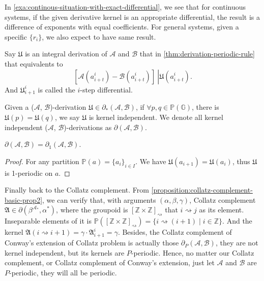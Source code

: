 In \cref{exa:continous-situation-with-exact-differential}, we see that for continuous systems, if the given derivative kernel is an appropriate differential, the result is a difference of exponents with equal coefficients. For general systems, given a specific $\{r_{i}\}$, we also expect to have same result.
\begin{definition}
    Say $\mathfrak{U}$ is an integral derivation of $\mathcal{A}$ and $\mathcal{B}$ that in \cref{thm:derivation-periodic-rule} that equivalents to
    \[ \left.\left[\mathcal{A}(a_{i+t}^{i}) - \mathcal{B}(a_{i+t}^{i})\right]\ \right\vert \mathfrak{U}(a_{i+t}^{i}). \]
    And $\mathfrak{U}_{i+1}^{i}$ is called the $i$-step differential.
\end{definition}
\begin{definition}
    Given a ($\mathcal{A}$, $\mathcal{B}$)-derivation $\mathfrak{U} \in \partial_{*}(\mathcal{A}, \mathcal{B})$, if $\forall p, q\in \mathbb{P}(\mathbb{G})$, there is $\mathfrak{U}(p) = \mathfrak{U}(q)$, we say $\mathfrak{U}$ is kernel independent.
    We denote all kernel independent ($\mathcal{A}$, $\mathcal{B}$)-derivations as $\partial(\mathcal{A}, \mathcal{B})$.
\end{definition}
\begin{proposition}
    $\partial(\mathcal{A}, \mathcal{B}) = \partial_{1}(\mathcal{A}, \mathcal{B})$.
\end{proposition}
\begin{proof}
    For any partition $\mathbb{P}(a) = \{a_i\}_{i\in I}$. We have $\mathfrak{U}(a_{i+1}) = \mathfrak{U}(a_{i})$, thus $\mathfrak{U}$ is 1-periodic on $a$.
\end{proof}
Finally back to the Collatz complement. From \cref{proposition:collatz-complement-basic-prop2}, we can verify that, with arguments $(\alpha, \beta, \gamma)$, Collatz complement $\mathfrak{A} \in \partial(\beta^{\mathcal{A}_{*}}, \alpha^{*})$, where the groupoid is $[\mathbb{Z}\times\mathbb{Z}]_{\rightsquigarrow}$ that $i \rightsquigarrow j$ as its element.
Inseparable elements of it is $\mathbb{P}([\mathbb{Z}\times\mathbb{Z}]_{\rightsquigarrow}) = \{i \rightsquigarrow (i + 1) \mid i \in \mathbb{Z}\}$. And the kernel $\mathfrak{A}(i \rightsquigarrow i + 1) = \gamma \cdot \mathfrak{A}_{i+1}^{i} = \gamma$.
Besides, the Collatz complement of Conway's extension of Collatz problem is actually those $\partial_{P}(\mathcal{A}, \mathcal{B})$, they are not kernel independent, but its kernels are $P$-periodic. Hence, no matter our Collatz complement, or Collatz complement of Conway's extension, just let $\mathcal{A}$ and $\mathcal{B}$ are $P$-periodic, they will all be periodic.

